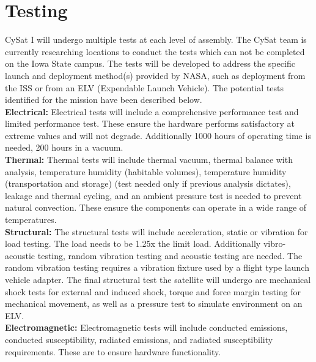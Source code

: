 \documentclass[nocover]            %
{CSLI}                       %
\begin{document}
\section{Testing}
CySat I will undergo multiple tests at each level of assembly. The CySat team is currently researching locations to conduct the tests which can not be completed on the Iowa State campus. The tests will be developed to address the specific launch and deployment method(s) provided by NASA, such as deployment from the ISS or from an ELV (Expendable Launch Vehicle). The potential tests identified for the mission have been described below.\\

\noindent\textbf{Electrical:} Electrical tests will include a comprehensive performance test and limited performance test.  These ensure the hardware performs satisfactory at extreme values and will not degrade.  Additionally 1000 hours of operating time is needed, 200 hours in a vacuum.\\

\noindent\textbf{Thermal:} Thermal tests will include thermal vacuum, thermal balance with analysis, temperature humidity (habitable volumes), temperature humidity (transportation and storage) (test needed only if previous analysis dictates), leakage and thermal cycling, and an ambient pressure test is needed to prevent natural convection. These ensure the components can operate in a wide range of temperatures.\\

\noindent\textbf{Structural:} The structural tests will include acceleration, static or vibration for load testing. The load needs to be 1.25x the limit load.  Additionally vibro-acoustic testing, random vibration testing and acoustic testing  are needed.  The random vibration testing requires a vibration fixture used by a flight type launch vehicle adapter. The final structural test the satellite will undergo are mechanical shock tests for external and induced shock, torque and force margin testing for mechanical movement, as well as a pressure test to simulate environment on an ELV.\\

\noindent\textbf{Electromagnetic:} Electromagnetic tests will include conducted emissions, conducted susceptibility, radiated emissions, and radiated susceptibility requirements.  These are to ensure hardware functionality.\\
\end{document}
